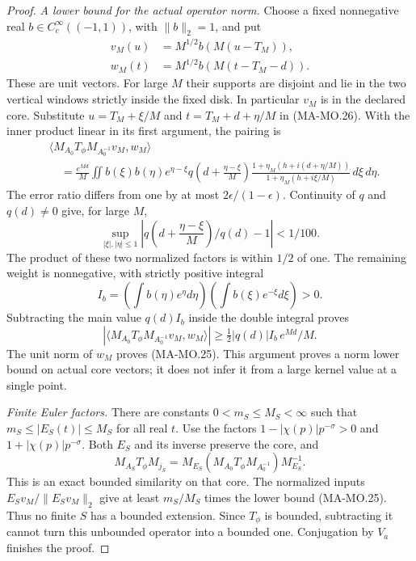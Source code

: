 \begin{proof}
\emph{A lower bound for the actual operator norm.}
Choose a fixed nonnegative real
\(b\in C_c^\infty((-1,1))\), with \(\|b\|_2=1\), and put
\[
 \begin{aligned}
 v_M(u)&=M^{1/2}b(M(u-T_M)),\\
 w_M(t)&=M^{1/2}b(M(t-T_M-d)).
 \end{aligned}
 \tag{MA-MO.31}
\]
These are unit vectors. For large \(M\) their supports
are disjoint and lie in the two vertical windows strictly
inside the fixed disk. In particular \(v_M\) is in the
declared core.
Substitute \(u=T_M+\xi/M\) and
\(t=T_M+d+\eta/M\) in (MA-MO.26). With the inner
product linear in its first argument, the pairing is
\[
 \begin{split}
 &\langle M_{A_0}T_\phi M_{A_0^{-1}}v_M,w_M\rangle\\
 &\quad=\frac{e^{Md}}{M}\iint b(\xi)b(\eta)e^{\eta-\xi}
       q\left(d+\frac{\eta-\xi}{M}\right)
       \frac{1+\eta_M(h+i(d+\eta/M))}
            {1+\eta_M(h+i\xi/M)}\,d\xi\,d\eta .
 \end{split}
 \tag{MA-MO.32}
\]
The error ratio differs from one by at most
\(2\epsilon/(1-\epsilon)\).
Continuity of \(q\) and \(q(d)\ne0\) give, for large \(M\),
\[
 \sup_{|\xi|,|\eta|\le1}
 \left|q\left(d+\frac{\eta-\xi}{M}\right)/q(d)-1\right|<1/100.
\]
The product of these two normalized factors is within
\(1/2\) of one. The remaining weight is nonnegative,
with strictly positive integral
\[
 I_b=\left(\int b(\eta)e^\eta d\eta\right)
                   \left(\int b(\xi)e^{-\xi}d\xi\right)>0.
 \tag{MA-MO.33}
\]
Subtracting the main value \(q(d)I_b\) inside the
double integral proves
\[
 |\langle M_{A_0}T_\phi M_{A_0^{-1}}v_M,w_M\rangle|
               \ge\tfrac12|q(d)|I_b\,e^{Md}/M.
 \tag{MA-MO.34}
\]
The unit norm of \(w_M\) proves (MA-MO.25).
This argument proves a norm lower bound on actual
core vectors; it does not infer it from a large
kernel value at a single point.

\emph{Finite Euler factors.}
There are constants \(0<m_S\le M_S<\infty\) such that
\(m_S\le|E_S(t)|\le M_S\) for all real \(t\).
Use the factors \(1-|\chi(p)|p^{-\sigma}>0\)
and \(1+|\chi(p)|p^{-\sigma}\).
Both \(E_S\) and its inverse preserve the core, and
\[
 M_{A_S}T_\phi M_{j_S}
       =M_{E_S}
          (M_{A_0}T_\phi M_{A_0^{-1}})
                                M_{E_S}^{-1}.
 \tag{MA-MO.35}
\]
This is an exact bounded similarity on that core.
The normalized inputs \(E_Sv_M/\|E_Sv_M\|_2\)
give at least \(m_S/M_S\) times the lower bound
(MA-MO.25). Thus no finite \(S\) has a bounded
extension. Since \(T_\phi\) is bounded, subtracting
it cannot turn this unbounded operator into a
bounded one. Conjugation by \(V_a\) finishes the proof.
\end{proof}

